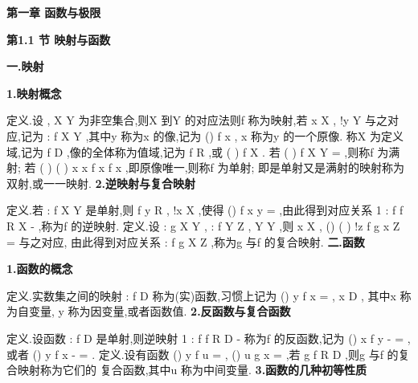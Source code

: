 \begin{center}
{\Large \bfseries \textcolor{lyred}{第一章 函数与极限}}
\end{center}

\vspace{6pt}
{\large \bfseries \textcolor{lyred}{第1.1 节 映射与函数}}

\vspace{4pt}
{\bfseries \textcolor{lyred}{一.映射}}

{\bfseries \textcolor{lyred}{1.映射概念}}

\textcolor{lyred}{定义}.设
,
X Y 为非空集合,则X 到Y 的对应法则f 称为\textcolor{lyred}{映射},若
x
X
\forall \in 
, !y
Y
\exists 
\in 
与之对应,记为
:
f
X
Y
\to 
,其中y 称为x 的\textcolor{lyred}{像},记为
()
f x , x 称为y 的一个\textcolor{lyred}{原像}. 
称X 为\textcolor{lyred}{定义域},记为
f
D ,像的全体称为\textcolor{lyred}{值域},记为
f
R ,或
(
)
f
X . 
若
(
)
f
X
Y
=
,则称f 为\textcolor{lyred}{满射}; 
若
(
)
(
)
x
x
f x
f x
\neq 
\Rightarrow 
\neq 
,即原像唯一,则称f 为\textcolor{lyred}{单射}; 
即是单射又是满射的映射称为\textcolor{lyred}{双射},或\textcolor{lyred}{一一映射}. 
{\bfseries \textcolor{lyred}{2.逆映射与复合映射}}

\textcolor{lyred}{定义}.若
:
f
X
Y
\to 
是单射,则
f
y
R
\forall \in 
, !x
X
\exists 
\in 
,使得
()
f x
y
=
,由此得到对应关系 
1 :
f
f
R
X
-
\to 
,称为f 的\textcolor{lyred}{逆映射}. 
\textcolor{lyred}{定义}.设
:
g X
Y
\to 
,
:
f Y
Z
\to 
,
Y
Y
\subset 
,则
x
X
\forall \in 
,
()
(
)
!z
f g x
Z
\exists 
=
\in 
与之对应, 
由此得到对应关系
:
f
g X
Z
\to 
\circ 
,称为g 与f 的\textcolor{lyred}{复合映射}. 
\vspace{4pt}
{\bfseries \textcolor{lyred}{二.函数}}

{\bfseries \textcolor{lyred}{1.函数的概念}}

\textcolor{lyred}{定义}.实数集之间的映射
:
f
D \to {}称为\textcolor{lyred}{(实)函数},习惯上记为
()
y
f x
=
, x
D
\in 
, 
其中x 称为\textcolor{lyred}{自变量}, y 称为\textcolor{lyred}{因变量},或者\textcolor{lyred}{函数值}. 
{\bfseries \textcolor{lyred}{2.反函数与复合函数}}

\textcolor{lyred}{定义}.设函数
:
f
D \to {}是单射,则逆映射
1 :
f
f
R
D
-
\to 
称为f 的\textcolor{lyred}{反函数},记为 
()
x
f
y
-
=
,或者
()
y
f
x
-
=
. 
\textcolor{lyred}{定义}.设有函数
()
y
f u
=
,
()
u
g x
=
,若
g
f
R
D
\subset 
,则g 与f 的复合映射称为它们的 
\textcolor{lyred}{复合函数},其中u 称为\textcolor{lyred}{中间变量}. 
{\bfseries \textcolor{lyred}{3.函数的几种初等性质}}

